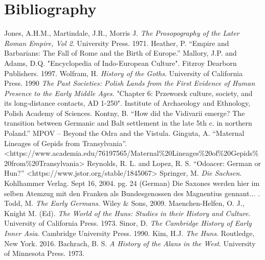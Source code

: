 \documentclass{article}
\newcommand{\specificCite}[1]{\tiny #1 \normalsize}
\begin{document}
	\newpage
	
	\section{Bibliography}
	\label{sec:Bibliography}
	
	\begin{thebibliography}{99}
		Jones, A.H.M., Martindale, J.R., Morris J. \textit{The Prosopography of the Later Roman Empire, Vol 2}. University Press. 1971.
		Heather, P. “Empire and Barbarians: The Fall of Rome and the Birth of Europe.”
		Mallory, J.P. and Adams, D.Q. "Encyclopedia of Indo-European Culture". Fitzroy Dearborn Publishers. 1997.
		Wolfram, H. \textit{History of the Goths}. University of California Press. 1990
		\textit{The Past Societies: Polish Lands from the First Evidence of Human Presence to the Early Middle Ages}. "Chapter 6: Przeworsk culture, society, and its long-distance contacts, AD 1-250". Institute of Archaeology and Ethnology, Polish Academy of Sciences.
		Kontny, B. “How did the Vidivarii emerge? The transition between Germanic and Balt settlement in the late 5th c. in northern Poland.” MPOV – Beyond the Odra and the Vistula.
		Ginguta, A. “Maternal Lineages of Gepids from Transylvania”. <https://www.academia.edu/76197565/Maternal\%20Lineages\%20of\%20Gepids\%20from\%20Transylvania>
		Reynolds, R. L. and Lopez, R. S. “Odoacer: German or Hun?” <https://www.jstor.org/stable/1845067>
		Springer, M. \textit{Die Sachsen}. Kohlhammer Verlag. Sept 16, 2004. pg. 24 (German)
		\newline\specificCite{Die Saxones werden hier im selben Atemzug mit den Franken als Bundesgenossen des Magnentius gennant...}.
		Todd, M. \textit{The Early Germans}. Wiley \& Sons, 2009.
		Maenchen-Helfen, O. J., Knight M. (Ed). \textit{The World of the Huns: Studies in their History and Culture}. University of California Press. 1973.
		Sinor, D. \textit{The Cambridge History of Early Inner Asia}. Cambridge University Press. 1990.
		Kim, H.J. \textit{The Huns}. Routledge, New York. 2016.
		Bachrach, B. S. \textit{A History of the Alans in the West}. University of Minnesota Press. 1973.

\end{thebibliography}
\end{document}
